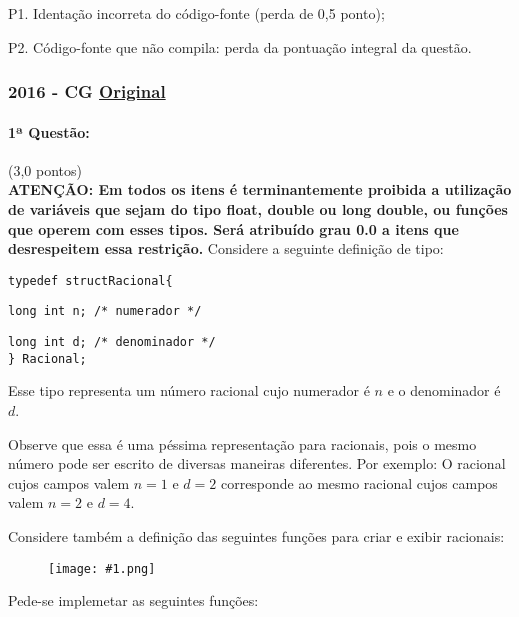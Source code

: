 \documentclass[12pt,a4paper]{article}
\newcommand{\original}[1]{\tiny \href{#1}{Original} \normalsize}
\newcommand{\imgh}[2]{\begin{figure}[h]
\centering
\texttt{[image: \#1.png]}
\end{figure}}
\begin{document}
P1. Identação incorreta do código-fonte (perda de 0,5 ponto);

P2. Código-fonte que não compila: perda da pontuação integral da questão. 

\newpage
\subsubsection{2016 - CG \original{https://drive.google.com/open?id=134wK-upxqmRjF2w9kVJd2NJH53YIaB6c}}

\paragraph{1ª Questão:} (3,0 pontos)\\
\footnotesize{\textbf{ATENÇÃO: Em todos os itens é terminantemente proibida a utilização de variáveis que sejam do tipo float, double ou long double, ou funções que operem com esses tipos. Será atribuído grau 0.0 a itens que desrespeitem essa restrição.}}
\normalsize
Considere a seguinte definição de tipo:

\noindent \texttt{typedef structRacional\{ }

\texttt{long int n; /* numerador */}

\texttt{long int d; /* denominador */ \\ \} Racional;  }

\vspace{4mm}

Esse tipo representa um número racional cujo numerador é $n$ e o denominador é $d$.

Observe que essa é uma péssima representação para racionais, pois o mesmo número pode ser escrito de diversas maneiras diferentes. Por exemplo: O racional cujos campos valem $n=1$ e $d=2$ corresponde ao mesmo racional cujos campos valem $n=2$ e $d=4$.

Considere também a definição das seguintes funções para criar e exibir racionais:

\imgh{icvf2016cgq1}{12}

Pede-se implemetar as seguintes funções:
\end{document}
